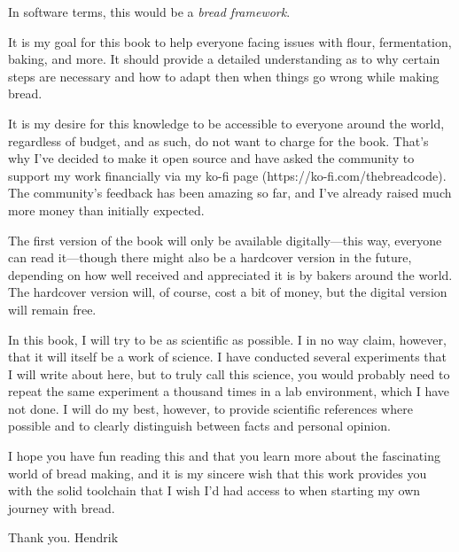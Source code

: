 In software terms, this would be a {\it bread framework}.

It is my goal for this book to help everyone facing issues with flour, fermentation, baking,
and more. It should provide a detailed understanding as to why certain steps are necessary
and how to adapt then when things go wrong while making bread.

It is my desire for this knowledge to be accessible to everyone around the world, regardless
of budget, and as such, do not want to charge for the book. That's why I've decided to make
it open source and have asked the community to support my work financially via my ko-fi page
(https://ko-fi.com/thebreadcode). The community's feedback has been amazing so far, and
I've already raised much more money than initially expected.

The first version of the book will only be available digitally---this way, everyone can read
it---though there might also be a hardcover version in the future, depending on how well received
and appreciated it is by bakers around the world. The hardcover version will, of course, cost a
bit of money, but the digital version will remain free.

In this book, I will try to be as scientific as possible. I in no way claim, however, that
it will itself be a work of science. I have conducted several experiments that I will write
about here, but to truly call this science, you would probably need to repeat the same experiment
a thousand times in a lab environment, which I have not done. I will do my best, however, to provide
scientific references where possible and to clearly distinguish between facts and personal opinion.

I hope you have fun reading this and that you learn more about the fascinating world of bread
making, and it is my sincere wish that this work provides you with the solid toolchain that I wish
I'd had access to when starting my own journey with bread.

Thank you.
Hendrik
